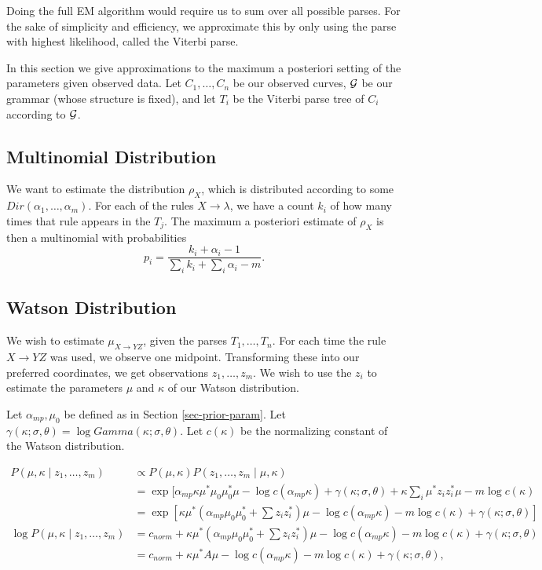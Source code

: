 \documentclass{article}
\begin{document}
Doing the full EM algorithm would require us to sum over all possible
parses. For the sake of simplicity and efficiency, we approximate this
by only using the parse with highest likelihood, called the Viterbi
parse.

In this section we give approximations to the maximum a posteriori
setting of the parameters given observed data. Let $C_1, \dots, C_n$
be our observed curves, ${\mathcal G}$ be our grammar (whose structure is
fixed), and let $T_i$ be the Viterbi parse tree of $C_i$ according to
${\mathcal G}$.

\subsection{Multinomial Distribution}

We want to estimate the distribution $\rho_X$, which is distributed
according to some $Dir(\alpha_1, \dots, \alpha_m)$. For each of the
rules $X\to \lambda$, we have a count $k_i$ of how many times that
rule appears in the $T_j$. The maximum a posteriori estimate of
$\rho_X$ is then a multinomial with probabilities 
$$p_i = \frac{k_i + \alpha_i - 1}{\sum_i k_i + \sum_i \alpha_i - m}.$$

\subsection{Watson Distribution}

We wish to estimate $\mu_{X\to YZ}$, given the parses $T_1, \dots,
T_n$. For each time the rule $X\to YZ$ was used, we observe one
midpoint. Transforming these into our preferred coordinates, we get
observations $z_1, \dots, z_m$. We wish to use the $z_i$ to estimate
the parameters $\mu$ and $\kappa$ of our Watson distribution.

Let $\alpha_{mp}, \mu_0$ be defined as in Section
\ref{sec-prior-param}. Let $\gamma(\kappa;\sigma,\theta) = \log
Gamma(\kappa; \sigma,\theta)$.  Let $c(\kappa)$ be the normalizing constant
of the Watson distribution.

\begin{align*}
P(\mu, \kappa \mid z_1,\dots,z_m) &\propto
P(\mu, \kappa) P(z_1,\dots,z_m\mid \mu, \kappa) \\
&= \exp[ \alpha_{mp}\kappa \mu^* \mu_0 \mu_0^* \mu
- \log c(\alpha_{mp} \kappa) + \gamma(\kappa; \sigma,\theta)
+ \kappa \sum_i \mu^* z_i z_i^* \mu - m \log c(\kappa)
\\
&= \exp[
\kappa \mu^* (\alpha_{mp} \mu_0 \mu_0^* + \sum z_i z_i^*)\mu
- \log c(\alpha_{mp} \kappa) - m \log c(\kappa) + 
\gamma(\kappa; \sigma, \theta) ]\\
\log P(\mu, \kappa \mid z_1,\dots,z_m) &= 
c_{norm} + 
\kappa \mu^* (\alpha_{mp} \mu_0 \mu_0^* + \sum z_i z_i^*)\mu
- \log c(\alpha_{mp} \kappa) - m \log c(\kappa) + 
\gamma(\kappa; \sigma, \theta) \\
&= c_{norm} + 
\kappa \mu^* A \mu
- \log c(\alpha_{mp} \kappa) - m \log c(\kappa) + 
\gamma(\kappa; \sigma, \theta),
\end{align*}
\end{document}
